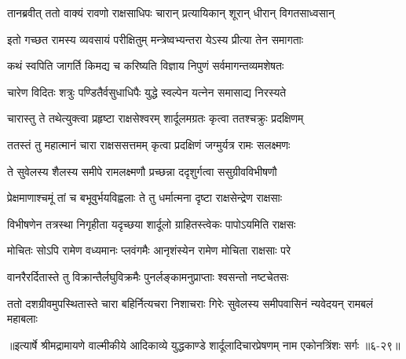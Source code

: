 \twolineshloka
{तानब्रवीत् ततो वाक्यं रावणो राक्षसाधिपः}
{चारान् प्रत्यायिकान् शूरान् धीरान् विगतसाध्वसान्} %

\twolineshloka
{इतो गच्छत रामस्य व्यवसायं परीक्षितुम्}
{मन्त्रेष्वभ्यन्तरा येऽस्य प्रीत्या तेन समागताः} %

\twolineshloka
{कथं स्वपिति जागर्ति किमद्य च करिष्यति}
{विज्ञाय निपुणं सर्वमागन्तव्यमशेषतः} %

\twolineshloka
{चारेण विदितः शत्रुः पण्डितैर्वसुधाधिपैः}
{युद्धे स्वल्पेन यत्नेन समासाद्य निरस्यते} %

\twolineshloka
{चारास्तु ते तथेत्युक्त्वा प्रहृष्टा राक्षसेश्वरम्}
{शार्दूलमग्रतः कृत्वा ततश्चक्रुः प्रदक्षिणम्} %

\twolineshloka
{ततस्तं तु महात्मानं चारा राक्षससत्तमम्}
{कृत्वा प्रदक्षिणं जग्मुर्यत्र रामः सलक्ष्मणः} %

\twolineshloka
{ते सुवेलस्य शैलस्य समीपे रामलक्ष्मणौ}
{प्रच्छन्ना ददृशुर्गत्वा ससुग्रीवविभीषणौ} %

\twolineshloka
{प्रेक्षमाणाश्चमूं तां च बभूवुर्भयविह्वलाः}
{ते तु धर्मात्मना दृष्टा राक्षसेन्द्रेण राक्षसाः} %

\twolineshloka
{विभीषणेन तत्रस्था निगृहीता यदृच्छया}
{शार्दूलो ग्राहितस्त्वेकः पापोऽयमिति राक्षसः} %

\twolineshloka
{मोचितः सोऽपि रामेण वध्यमानः प्लवंगमैः}
{आनृशंस्येन रामेण मोचिता राक्षसाः परे} %

\twolineshloka
{वानरैरर्दितास्ते तु विक्रान्तैर्लघुविक्रमैः}
{पुनर्लङ्कामनुप्राप्ताः श्वसन्तो नष्टचेतसः} %

\twolineshloka
{ततो दशग्रीवमुपस्थितास्ते चारा बहिर्नित्यचरा निशाचराः}
{गिरेः सुवेलस्य समीपवासिनं न्यवेदयन् रामबलं महाबलाः} %


॥इत्यार्षे श्रीमद्रामायणे वाल्मीकीये आदिकाव्ये युद्धकाण्डे शार्दूलादिचारप्रेषणम् नाम एकोनत्रिंशः सर्गः ॥६-२९॥
